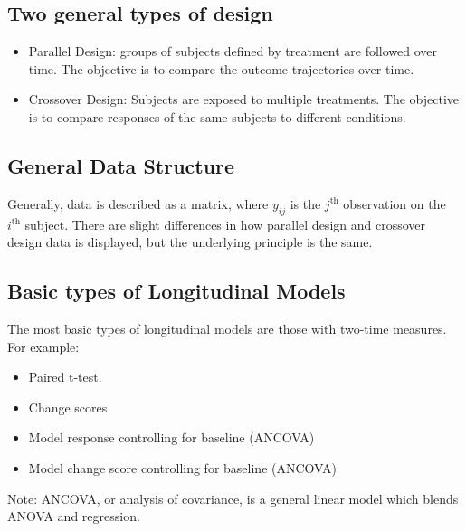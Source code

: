 \documentclass{article}
\theoremstyle{definition}
\begin{document}
\subsection{Two general types of design}
\begin{itemize}
	\item Parallel Design: groups of subjects defined by treatment are followed over time. The objective is to compare the outcome trajectories over time.
	\item Crossover Design: Subjects are exposed to multiple treatments. The objective is to compare responses of the same subjects to different conditions. 
\end{itemize}


\subsection{General Data Structure}
Generally, data is described as a matrix, where $y_{ij}$ is the $j^{\text{th}}$ observation on the $i^{\text{th}}$ subject. There are slight differences in how parallel design and crossover design data is displayed, but the underlying principle is the same. 

\subsection{Basic types of Longitudinal Models}
The most basic types of longitudinal models are those with two-time measures. For example:
\begin{itemize}
	\item  Paired t-test.
	\item Change scores
	\item Model response controlling for baseline (ANCOVA)
	\item Model change score controlling for baseline (ANCOVA)
\end{itemize}
Note: ANCOVA, or analysis of covariance, is a general linear model which blends ANOVA and regression. 


\newpage
\end{document}
